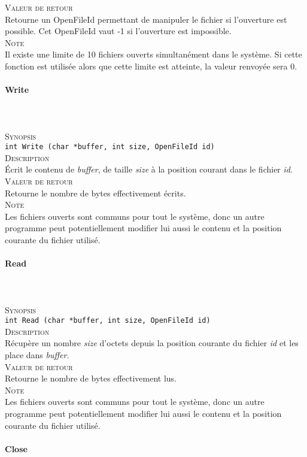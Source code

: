 \documentclass{report}
\newcommand{\myparagraph}[1]{\paragraph*{#1}\mbox{}\\}
\begin{document}
\textsc{Valeur de retour}\\
	Retourne un OpenFileId permettant de manipuler le fichier si l'ouverture est possible. Cet OpenFileId vaut -1 si l'ouverture est impossible.\\	

\textsc{Note}\\
	Il existe une limite de 10 fichiers ouverts simultanément dans le système. Si cette fonction est utilisée alors que cette limite est atteinte, la valeur renvoyée sera 0.\\
\myparagraph{Write}\\

\textsc{Synopsis}\\	
	\texttt{int Write (char *buffer, int size, OpenFileId id)}\\
	
\textsc{Description}\\
	Écrit le contenu de \textit{buffer}, de taille \textit{size} à la position courant dans le fichier \textit{id}.  \\	

\textsc{Valeur de retour}\\
	Retourne le nombre de bytes effectivement écrits.\\	

\textsc{Note}\\
	Les fichiers ouverts sont communs pour tout le système, donc un autre programme peut potentiellement modifier lui aussi le contenu et la position courante du fichier utilisé.\\	
\myparagraph{Read}\\

\textsc{Synopsis}\\	
	\texttt{int Read (char *buffer, int size, OpenFileId id)}\\
	
\textsc{Description}\\
	Récupère un nombre \textit{size} d'octets depuis la position courante du fichier \textit{id} et les place dans \textit{buffer}.  \\	

\textsc{Valeur de retour}\\
	Retourne le nombre de bytes effectivement lus.\\
	
\textsc{Note}\\
	Les fichiers ouverts sont communs pour tout le système, donc un autre programme peut potentiellement modifier lui aussi le contenu et la position courante du fichier utilisé.\\	
\myparagraph{Close}\\
\end{document}
